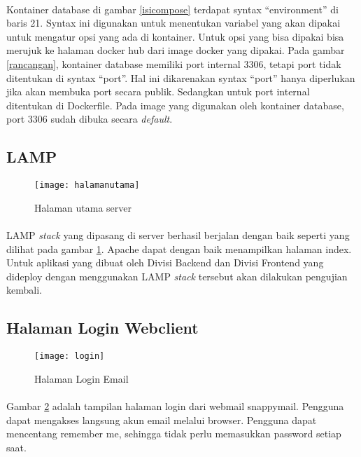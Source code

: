 \documentclass[./bab_4.tex]{subfiles}
\begin{document}
\paragraph*{}Kontainer database di gambar \ref{isicompose}
terdapat syntax ``environment'' di baris 21. Syntax ini
digunakan untuk menentukan variabel yang akan dipakai untuk
mengatur opsi yang ada di kontainer. Untuk opsi yang bisa
dipakai bisa merujuk ke halaman docker hub dari image docker
yang dipakai. Pada gambar \ref{rancangan}, kontainer
database memiliki port internal 3306, tetapi port tidak
ditentukan di syntax ``port''. Hal ini dikarenakan syntax
``port'' hanya diperlukan jika akan membuka port secara
publik. Sedangkan untuk port internal ditentukan di
Dockerfile. Pada image yang digunakan oleh kontainer
database, port 3306 sudah dibuka secara \textit{default}.

\subsection{LAMP}

\begin{figure}[ht!]
  \begin{center}
    \texttt{[image: halamanutama]}
  \end{center}
  \caption{Halaman utama server}
  \label{halamanutama}
\end{figure}

\paragraph*{}LAMP \textit{stack} yang dipasang di server berhasil
berjalan dengan baik seperti yang dilihat pada gambar
\ref{halamanutama}. Apache dapat dengan baik menampilkan
halaman index. Untuk aplikasi yang dibuat oleh Divisi
Backend dan Divisi Frontend yang dideploy dengan
menggunakan LAMP \textit{stack} tersebut akan dilakukan
pengujian kembali.


\subsection{Halaman Login Webclient}
\begin{figure}[ht!]
  \begin{center}
    \texttt{[image: login]}
  \end{center}
  \caption{Halaman Login Email}
  \label{login}
\end{figure}
\paragraph*{}Gambar \ref{login} adalah tampilan halaman
login dari webmail snappymail. Pengguna dapat mengakses
langsung akun email melalui browser. Pengguna dapat
mencentang remember me, sehingga tidak perlu memasukkan
password setiap saat.
\end{document}
